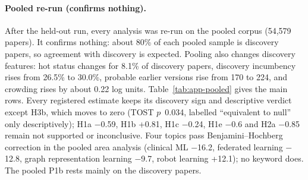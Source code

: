 \paragraph{Pooled re-run (confirms nothing).} After the held-out run, every analysis was re-run on the pooled corpus
(54,579 papers). It confirms nothing: about 80\% of each pooled sample is discovery papers, so agreement with
discovery is expected. Pooling also changes discovery features: hot status changes for 8.1\% of discovery papers,
discovery incumbency rises from 26.5\% to 30.0\%, probable earlier versions rise from 170 to 224, and crowding rises by
about 0.22 log units. Table~\ref{tab:app-pooled} gives the main rows. Every registered estimate keeps its discovery
sign and descriptive verdict except H3b, which moves to zero (TOST $p$~0.034, labelled ``equivalent to null'' only
descriptively); H1a $-$0.59, H1b +0.81, H1c $-$0.24, H1e $-$0.6 and H2a $-$0.85 remain not supported or inconclusive.
Four topics pass Benjamini--Hochberg correction in the pooled area analysis (clinical ML $-$16.2, federated learning
$-$12.8, graph representation learning $-$9.7, robot learning +12.1); no keyword does. The pooled P1b rests mainly on the
discovery papers.

